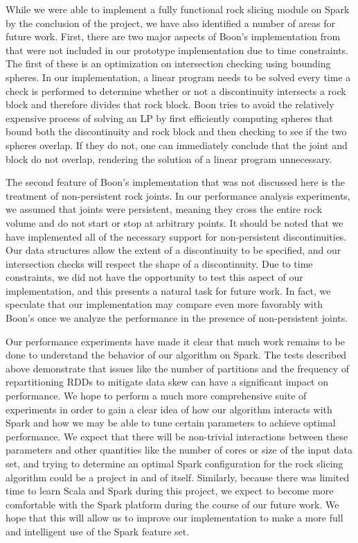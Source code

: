 While we were able to implement a fully functional rock slicing module on Spark by the conclusion of the project, we have also identified a number of areas for future work. First, there are two major aspects of Boon's implementation from \cite{slicing} that were not included in our prototype implementation due to time constraints. The first of these is an optimization on intersection checking using bounding spheres. In our implementation, a linear program needs to be solved every time a check is performed to determine whether or not a discontinuity intersects a rock block and therefore divides that rock block. Boon tries to avoid the relatively expensive process of solving an LP by first efficiently computing spheres that bound both the discontinuity and rock block and then checking to see if the two spheres overlap. If they do not, one can immediately conclude that the joint and block do not overlap, rendering the solution of a linear program unnecessary.

The second feature of Boon's implementation that was not discussed here is the treatment of non-persistent rock joints. In our performance analysis experiments, we assumed that joints were persistent, meaning they cross the entire rock volume and do not start or stop at arbitrary points. It should be noted that we have implemented all of the necessary support for non-persistent discontinuities. Our data structures allow the extent of a discontinuity to be specified, and our intersection checks will respect the shape of a discontinuity. Due to time constraints, we did not have the opportunity to test this aspect of our implementation, and this presents a natural task for future work. In fact, we speculate that our implementation may compare even more favorably with Boon's once we analyze the performance in the presence of non-persistent joints.

Our performance experiments have made it clear that much work remains to be done to understand the behavior of our algorithm on Spark. The tests described above demonstrate that issues like the number of partitions and the frequency of repartitioning RDDs to mitigate data skew can have a significant impact on performance. We hope to perform a much more comprehensive suite of experiments in order to gain a clear idea of how our algorithm interacts with Spark and how we may be able to tune certain parameters to achieve optimal performance. We expect that there will be non-trivial interactions between these parameters and other quantities like the number of cores or size of the input data set, and trying to determine an optimal Spark configuration for the rock slicing algorithm could be a project in and of itself. Similarly, because there was limited time to learn Scala and Spark during this project, we expect to become more comfortable with the Spark platform during the course of our future work. We hope that this will allow us to improve our implementation to make a more full and intelligent use of the Spark feature set.

